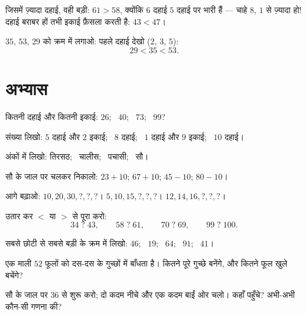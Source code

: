 \begin{method}[दहाइयों से तुलना]\label{met:g1:tens:compare}
जिसमें ज़्यादा दहाई, वही बड़ी: $61 > 58$, क्योंकि $6$ दहाई $5$
दहाई पर भारी हैं --- चाहे $8$, $1$ से ज़्यादा हो! दहाई बराबर हों
तभी इकाई फ़ैसला करती है: $43 < 47$।
\end{method}

\begin{example}\label{ex:g1:tens:compare}
$35$, $53$, $29$ को क्रम में लगाओ: पहले दहाई देखो ($2$, $3$, $5$):
\[
29 < 35 < 53 .
\]
\end{example}

\section{अभ्यास}

\begin{exercise}[$\star$]\label{exo:g1:tens:1}
कितनी दहाई और कितनी इकाई: $26$; \ $40$; \ $73$; \ $99$?
\end{exercise}

\begin{exercise}[$\star$]\label{exo:g1:tens:2}
संख्या लिखो: $5$ दहाई और $2$ इकाई; \ $8$ दहाई; \ $1$ दहाई और
$9$ इकाई; \ $10$ दहाई।
\end{exercise}

\begin{exercise}[$\star$]\label{exo:g1:tens:3}
अंकों में लिखो: तिरसठ; \ चालीस; \ पचासी; \ सौ।
\end{exercise}

\begin{exercise}[$\star$]\label{exo:g1:tens:4}
सौ के जाल पर चलकर निकालो: $23 + 10$; \quad $67 + 10$;
\quad $45 - 10$; \quad $80 - 10$।
\end{exercise}

\begin{exercise}[$\star$]\label{exo:g1:tens:5}
आगे बढ़ाओ: $10, 20, 30, ?, ?, ?$। \quad
$5, 10, 15, ?, ?, ?$। \quad $12, 14, 16, ?, ?, ?$।
\end{exercise}

\begin{exercise}[$\star$]\label{exo:g1:tens:6}
उतार कर $<$ या $>$ से पूरा करो:
\[
34 \;?\; 43, \qquad
58 \;?\; 61, \qquad
70 \;?\; 69, \qquad
99 \;?\; 100 .
\]
\end{exercise}

\begin{exercise}[$\star$]\label{exo:g1:tens:7}
सबसे छोटी से सबसे बड़ी के क्रम में लिखो: $46$; \ $19$; \ $64$; \ $91$; \
$41$।
\end{exercise}

\begin{exercise}[$\star$]\label{exo:g1:tens:8}
एक माली $52$ फूलों को दस-दस के गुच्छों में बाँधता है। कितने पूरे
गुच्छे बनेंगे, और कितने फूल खुले बचेंगे?
\end{exercise}

\begin{exercise}[$\star\star$]\label{exo:g1:tens:9}
सौ के जाल पर $36$ से शुरू करो; दो कदम नीचे और एक कदम बाईं ओर
चलो। कहाँ पहुँचे? अभी-अभी कौन-सी गणना की?
\end{exercise}
